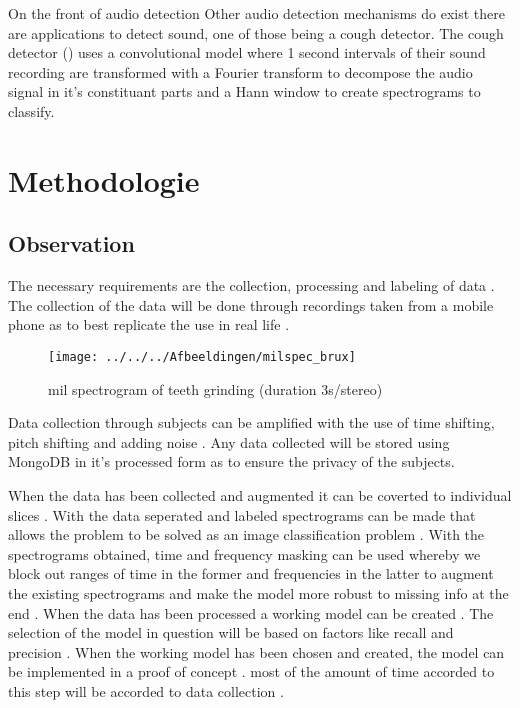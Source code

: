 \documentclass{hogent-article}
\begin{document}
On the front of audio detection 
Other audio detection mechanisms do exist  there are applications to detect sound, one of those being a cough detector.
The cough detector () uses a convolutional model where 1 second intervals of their sound recording are transformed with a Fourier transform to decompose the audio signal in it's constituant parts and a Hann window to create spectrograms to classify.


\section{Methodologie}

\subsection{Observation}

The necessary requirements are the collection, processing and labeling of data .
The collection of the data will be done through recordings taken from a mobile phone as to best replicate the use in real life .

\begin{figure}[h!]
    \centering
    \texttt{[image: ../../../Afbeeldingen/milspec\_brux]}
    \caption{mil spectrogram of teeth grinding (duration 3s/stereo)}
    \label{fig:mil spectrogram of teeth grinding (duration 3s)}
\end{figure}


Data collection through subjects can be amplified with the use of 
time shifting, pitch shifting and adding noise .
\newline
Any data collected will be stored using MongoDB in it's processed form as to ensure the privacy of the subjects.

\bigbreak
When the data has been collected and augmented it can be coverted to individual slices .
With the data seperated and labeled spectrograms can be made that allows the problem to be solved as an image classification problem .
\bigbreak
With the spectrograms obtained, time and frequency masking can be used whereby we block out ranges of time in the former and frequencies in the latter to augment the existing spectrograms and make the model more robust to missing info at the end .
\bigbreak
When the data has been processed a working model can be created . The selection of the model in question will be based on factors like recall and precision . 
When the working model has been chosen and created, the model can be implemented in a proof of concept .
most of the amount of time accorded to this step will be accorded to data collection .
\end{document}
